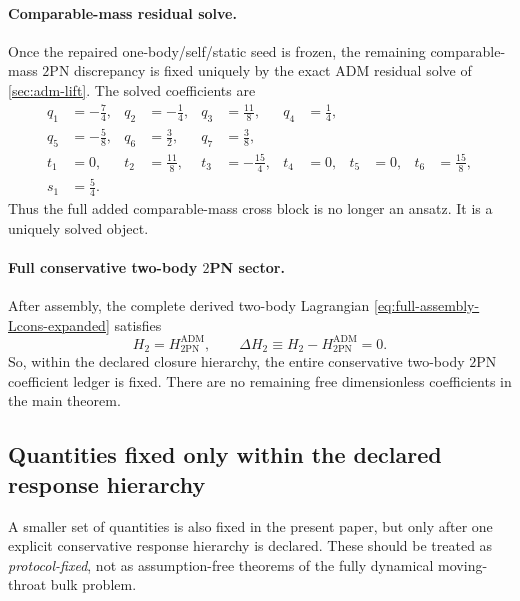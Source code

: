 \documentclass[11pt]{article}
\newcommand{\TwoPN}{\mathrm{2PN}}
\newcommand{\ADM}{\mathrm{ADM}}
\begin{document}
\paragraph{Comparable-mass residual solve.}
Once the repaired one-body/self/static seed is frozen, the remaining comparable-mass
\(\TwoPN\) discrepancy is fixed uniquely by the exact \(\ADM\) residual solve of
\cref{sec:adm-lift}.
The solved coefficients are
\begin{align}
q_1&=-\frac74,
& q_2&=-\frac14,
& q_3&=\frac{11}{8},
& q_4&=\frac14,
\nonumber\\
q_5&=-\frac58,
& q_6&=\frac32,
& q_7&=\frac38,
\label{eq:status-fixed-qs}
\\[0.5ex]
 t_1&=0,
& t_2&=\frac{11}{8},
& t_3&=-\frac{15}{4},
& t_4&=0,
& t_5&=0,
& t_6&=\frac{15}{8},
\label{eq:status-fixed-ts}
\\[0.5ex]
 s_1&=\frac54.
\label{eq:status-fixed-s1}
\end{align}
Thus the full added comparable-mass cross block is no longer an ansatz.
It is a uniquely solved object.

\paragraph{Full conservative two-body \texorpdfstring{$2$}{2}PN sector.}
After assembly, the complete derived two-body Lagrangian
\cref{eq:full-assembly-Lcons-expanded} satisfies
\begin{equation}
H_2=H^{\ADM}_{2\mathrm{PN}},
\qquad
\Delta H_2\equiv H_2-H^{\ADM}_{2\mathrm{PN}}=0.
\label{eq:status-fixed-full-match}
\end{equation}
So, within the declared closure hierarchy, the entire conservative two-body
\(\TwoPN\) coefficient ledger is fixed.
There are no remaining free dimensionless coefficients in the main theorem.

\subsection{Quantities fixed only within the declared response hierarchy}
\label{sec:status-protocol}

A smaller set of quantities is also fixed in the present paper, but only after one
explicit conservative response hierarchy is declared.
These should be treated as \emph{protocol-fixed}, not as assumption-free theorems of the
fully dynamical moving-throat bulk problem.
\end{document}
